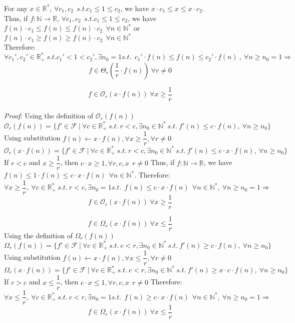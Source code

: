 	For any $x \in \mathbb{R}^{*}$,  $\forall c_{1}, c_{2}\ \ s.t.  c_{1} \leq 1 \leq c_{2}$, we have $ x \cdot c_{1} \leq x \leq x \cdot c_{2} $. \\
   	Thus, if $f:\mathbb{N}\longrightarrow\mathbb{R}$, $\forall c_{1}, c_{2}\ \  s.t.  c_{1} \leq 1 \leq c_{2}$, we have $f(n) \cdot c_{1} \leq f(n) \leq f(n) \cdot c_{2}\ \ \forall n \in \mathbb{N}^{*}$ or $f(n) \cdot c_{1} \geq f(n) \geq f(n) \cdot c_{2}\ \ \forall n \in \mathbb{N}^{*}$\\
   	Therefore:
   	\[\forall c_{1}', c_{2}' \in \mathbb{R}^{*}_{+} \ s.t.  c_{1}'< 1 < c_{2}' , \exists n_{0} = 1  s.t.\  \ c_{1}' \cdot f(n) \leq  f(n) \leq c_{2}' \cdot f(n)\ ,\  \forall n \geq n_{0}=1 \Rightarrow \]
   	\[ f \in \Theta_{r} \left( \frac{1}{r} \cdot f(n) \right)\ \forall r \neq 0 \]
\qedsymbol
 
 
 \[ f \in \mathcal{O}_{r} \left( x \cdot f(n) \right)\ \forall x \geq \dfrac{1}{r} \]
   \\\textit{Proof}:
    Using the definition of $ \mathcal{O}_{r}(f(n))$
  \[\mathcal{O}_{r}(f(n)) = \lbrace f' \in \mathcal{F}\ |\ \forall c  \in \mathbb{R}^{*}_{+} \ s.t.\  r<c, \exists n_{0} \in \mathbb{N}^{*}\ s.t.\  f'(n) \leq c \cdot f(n),\  \forall n \geq n_{0} \rbrace\]
    Using substitution $ f(n) \longleftarrow x \cdot f(n), \forall x \geq \dfrac{1}{r}, \forall r \neq 0$
  \[\mathcal{O}_{r}(x \cdot f(n)) = \lbrace f' \in \mathcal{F}\ |\ \forall c  \in \mathbb{R}^{*}_{+} \ s.t.\  r<c, \exists n_{0} \in \mathbb{N}^{*}\ s.t.\  f'(n) \leq c \cdot x \cdot f(n),\  \forall n \geq n_{0} \rbrace\]
If $r<c$ and $x \geq \dfrac{1}{r}$, then $c \cdot x \geq 1, \forall r,c,x\ \ r \neq 0$
   	Thus, if $f:\mathbb{N}\longrightarrow\mathbb{R}$, we have $ f(n) \leq 1 \cdot f(n) \leq  c \cdot x\cdot f(n) \ \ \forall n \in \mathbb{N}^{*}$. 
   	Therefore:
   	\[\forall x \geq \dfrac{1}{r}, \ \forall c \in \mathbb{R}^{*}_{+} \ s.t.\  r<c , \exists n_{0} = 1  s.t.\  \  f(n) \leq  c \cdot x\cdot f(n) \ \ \forall n \in \mathbb{N}^{*} ,\  \forall n \geq n_{0}=1 \Rightarrow \]
 \[ f \in \mathcal{O}_{r} \left( x \cdot f(n) \right)\ \forall x \geq \dfrac{1}{r} \]
\qedsymbol

 \[ f \in \Omega_{r} \left( x \cdot f(n) \right)\ \forall x \leq \dfrac{1}{r} \]
    Using the definition of $\Omega_{r}(f(n))$
  \[\Omega_{r}(f(n)) = \lbrace f' \in \mathcal{F}\ |\ \forall c  \in \mathbb{R}^{*}_{+} \ s.t.\  c<r, \exists n_{0} \in \mathbb{N}^{*}\ s.t.\  f'(n) \geq c \cdot f(n),\  \forall n \geq n_{0} \rbrace\]
    Using substitution $ f(n) \longleftarrow x \cdot f(n), \forall x \leq \dfrac{1}{r}, \forall r \neq 0$
  \[\Omega_{r}(x \cdot f(n)) = \lbrace f' \in \mathcal{F}\ |\ \forall c  \in \mathbb{R}^{*}_{+} \ s.t.\  c<r, \exists n_{0} \in \mathbb{N}^{*}\ s.t.\  f'(n) \geq x \cdot c \cdot f(n),\  \forall n \geq n_{0} \rbrace\]
If $r>c$ and $x \leq \dfrac{1}{r}$, then $c \cdot x \leq 1, \forall r,c,x\ \ r \neq 0$
   	Therefore:
   	\[\forall x \leq \dfrac{1}{r}, \ \forall c \in \mathbb{R}^{*}_{+} \ s.t.\  c<r , \exists n_{0} = 1  s.t.\  \  f(n) \geq  c \cdot x\cdot f(n) \ \ \forall n \in \mathbb{N}^{*} ,\  \forall n \geq n_{0}=1 \Rightarrow \]
 \[ f \in \Omega_{r} \left( x \cdot f(n) \right)\ \forall x \leq \dfrac{1}{r} \]
\qedsymbol

